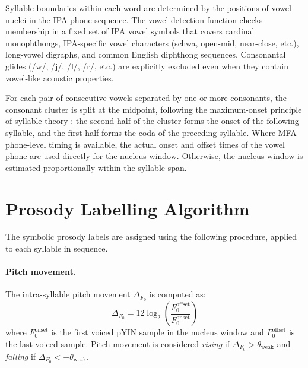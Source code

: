 Syllable boundaries within each word are determined by the positions of vowel
nuclei in the IPA phone sequence. The vowel detection function checks membership
in a fixed set of IPA vowel symbols that covers cardinal monophthongs,
IPA-specific vowel characters (schwa, open-mid, near-close, etc.), long-vowel
digraphs, and common English diphthong sequences. Consonantal glides (/w/, /j/,
/l/, /r/, etc.) are explicitly excluded even when they contain vowel-like
acoustic properties.

For each pair of consecutive vowels separated by one or more consonants, the
consonant cluster is split at the midpoint, following the maximum-onset principle
of syllable theory \cite{kahn1976syllable}: the second half of the cluster forms
the onset of the following syllable, and the first half forms the coda of the
preceding syllable. Where MFA phone-level timing is available, the actual onset
and offset times of the vowel phone are used directly for the nucleus window.
Otherwise, the nucleus window is estimated proportionally within the syllable
span.

\section{Prosody Labelling Algorithm}
\label{sec:prosody_label_method}

The symbolic prosody labels are assigned using the following procedure, applied
to each syllable in sequence.

\paragraph{Pitch movement.}
The intra-syllable pitch movement $\Delta_{F_0}$ is computed as:
\begin{equation}
  \Delta_{F_0} = 12 \log_2\!\left(\frac{F_0^{\mathrm{offset}}}{F_0^{\mathrm{onset}}}\right)
\end{equation}
where $F_0^{\mathrm{onset}}$ is the first voiced pYIN sample in the nucleus
window and $F_0^{\mathrm{offset}}$ is the last voiced sample. Pitch movement is
considered \emph{rising} if $\Delta_{F_0} > \theta_{\mathrm{weak}}$ and
\emph{falling} if $\Delta_{F_0} < -\theta_{\mathrm{weak}}$.

